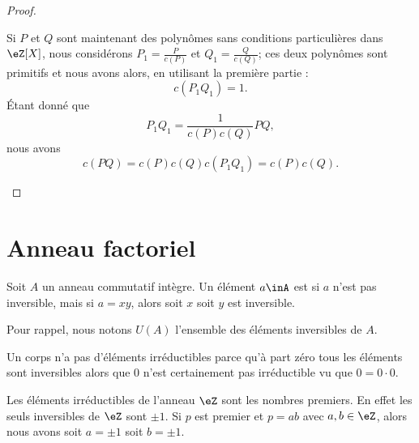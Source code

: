 \begin{proof}
\begin{subproof}
            Si \( P\) et \( Q\) sont maintenant des polynômes sans conditions particulières dans \( \eZ[X]\), nous considérons \( P_1=\frac{ P }{ c(P) }\) et \( Q_1=\frac{ Q }{ c(Q) }\); ces deux polynômes sont primitifs et nous avons alors, en utilisant la première partie :
            \begin{equation}
                c(P_1Q_1)=1.
            \end{equation}
            Étant donné que
            \begin{equation}
                P_1Q_1=\frac{1}{ c(P)c(Q) }PQ,
            \end{equation}
            nous avons
            \begin{equation}
                c(PQ)=c(P)c(Q)c(P_1Q_1)=c(P)c(Q).
            \end{equation}
    \end{subproof}
\end{proof}

\section{Anneau factoriel}

\begin{definition}  \label{DeirredBDhQfA}
    Soit \( A\) un anneau commutatif intègre. Un élément \( a\inA\) est  si \( a\) n'est pas inversible, mais si \( a=xy\), alors soit \( x\) soit \( y\) est inversible.
\end{definition}

Pour rappel, nous notons \( U(A)\) l'ensemble des éléments inversibles de \( A\).

\begin{remark}
    Un corps n'a pas d'éléments irréductibles parce qu'à part zéro tous les éléments sont inversibles alors que \( 0\) n'est certainement pas irréductible vu que \( 0=0\cdot 0\).
\end{remark}

\begin{example}
    Les éléments irréductibles de l'anneau \( \eZ\) sont les nombres premiers. En effet les seuls inversibles de \( \eZ\) sont \( \pm 1\). Si \( p\) est premier et \( p=ab\) avec \( a,b\in \eZ\), alors nous avons soit \( a=\pm 1\) soit \( b=\pm 1\).
\end{example}

